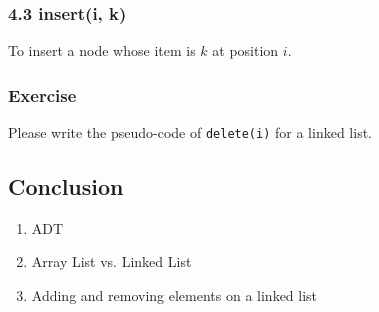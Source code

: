 \documentclass[aspectratio=169, 14pt]{beamer}
\begin{document}
\begin{frame}
	\frametitle{4.3 insert(i, k)}
	To insert a node whose item is $k$ at position $i$.


\end{frame}

\begin{frame}
	\frametitle{Exercise}
	{\large {}} Please write the pseudo-code of \texttt{delete(i)} for a linked list.
\end{frame}

\begin{frame}

	\section{\textcolor{darkmidnightblue}{Conclusion}}
	\begin{enumerate}
		\item ADT
		\item Array List vs. Linked List
		\item Adding and removing elements on a linked list
	\end{enumerate}
\end{frame}
\end{document}
